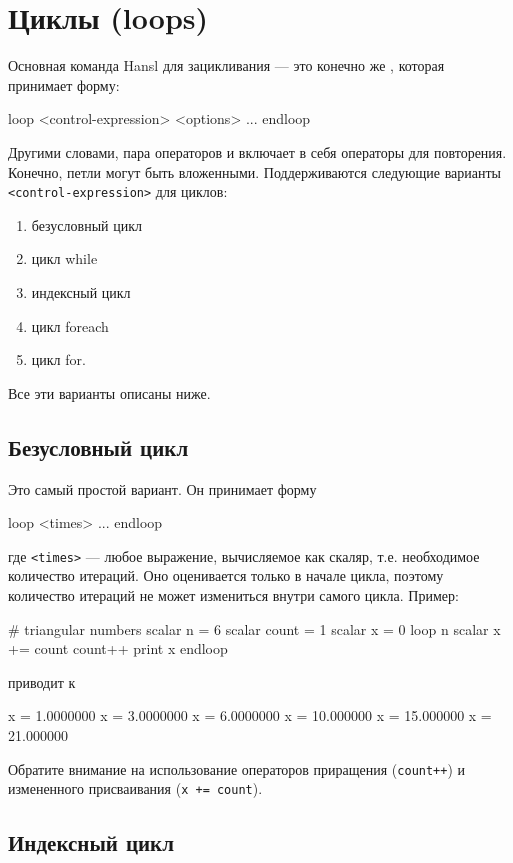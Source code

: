 \section{Циклы (loops)}
\label{sec:hr-loops}

Основная команда Hansl для зацикливания --- это конечно же ,
которая принимает форму:
\begin{code}
loop <control-expression> <options>
    ...
endloop
\end{code}
Другими словами, пара операторов  и  включает в
себя операторы для повторения. Конечно, петли могут быть
вложенными. Поддерживаются следующие варианты
\texttt{<control-expression>} для циклов:
\begin{enumerate}
\item безусловный цикл
\item цикл while
\item индексный цикл
\item цикл foreach
\item цикл for.
\end{enumerate}
Все эти варианты описаны ниже. 

\subsection{Безусловный цикл}

Это самый простой вариант. Он принимает форму
\begin{code}
loop <times>
   ...
endloop
\end{code}
где \texttt{<times>} --- любое выражение, вычисляемое как скаляр,
т.е. необходимое количество итераций. Оно оценивается только в начале
цикла, поэтому количество итераций не может измениться внутри самого
цикла. Пример:
\begin{code}
# triangular numbers
scalar n = 6
scalar count = 1
scalar x = 0
loop n
    scalar x += count
    count++
    print x
endloop
\end{code}
приводит к
\begin{code}
              x =  1.0000000
              x =  3.0000000
              x =  6.0000000
              x =  10.000000
              x =  15.000000
              x =  21.000000
\end{code}

Обратите внимание на использование операторов приращения
(\texttt{count++}) и измененного присваивания (\texttt{x += count}).

\subsection{Индексный цикл}

